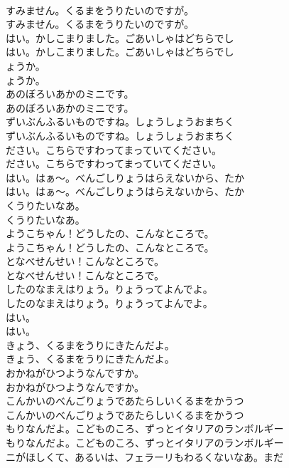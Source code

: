 \documentclass[8pt]{extreport}
\begin{document}
\begin{CJK}{UTF8}{min}
\\	すみません。くるまをうりたいのですが。
\\	すみません。くるまをうりたいのですが。
\\	はい。かしこまりました。ごあいしゃはどちらでし
\\	はい。かしこまりました。ごあいしゃはどちらでし
\\	ょうか。
\\	ょうか。
\\	あのぼろいあかのミニです。
\\	あのぼろいあかのミニです。
\\	ずいぶんふるいものですね。しょうしょうおまちく
\\	ずいぶんふるいものですね。しょうしょうおまちく
\\	ださい。こちらですわってまっていてください。
\\	ださい。こちらですわってまっていてください。
\\	はい。はぁ～。べんごしりょうはらえないから、たか
\\	はい。はぁ～。べんごしりょうはらえないから、たか
\\	くうりたいなあ。
\\	くうりたいなあ。
\\	ようこちゃん！どうしたの、こんなところで。
\\	ようこちゃん！どうしたの、こんなところで。
\\	となべせんせい！こんなところで。
\\	となべせんせい！こんなところで。
\\	したのなまえはりょう。りょうってよんでよ。
\\	したのなまえはりょう。りょうってよんでよ。
\\	はい。
\\	はい。
\\	きょう、くるまをうりにきたんだよ。
\\	きょう、くるまをうりにきたんだよ。
\\	おかねがひつようなんですか。
\\	おかねがひつようなんですか。
\\	こんかいのべんごりょうであたらしいくるまをかうつ
\\	こんかいのべんごりょうであたらしいくるまをかうつ
\\	もりなんだよ。こどものころ、ずっとイタリアのランボルギー
\\	もりなんだよ。こどものころ、ずっとイタリアのランボルギー
\\	ニがほしくて、あるいは、フェラーリもわるくないなあ。まだ

\end{CJK}
\end{document}
